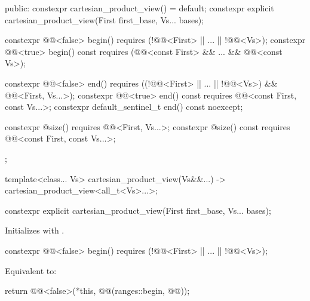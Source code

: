 \begin{codeblock}
{{  public:
    constexpr cartesian_product_view() = default;
    constexpr explicit cartesian_product_view(First first_base, Vs... bases);

    constexpr @@<false> begin()
      requires (!@@<First> || ... || !@@<Vs>);
    constexpr @@<true> begin() const
      requires (@@<const First> && ... && @@<const Vs>);

    constexpr @@<false> end()
      requires ((!@@<First> || ... || !@@<Vs>) &&
        @@<First, Vs...>);
    constexpr @@<true> end() const
      requires @@<const First, const Vs...>;
    constexpr default_sentinel_t end() const noexcept;

    constexpr @\seebelow@ size()
      requires @@<First, Vs...>;
    constexpr @\seebelow@ size() const
      requires @@<const First, const Vs...>;
  };

  template<class... Vs>
    cartesian_product_view(Vs&&...) -> cartesian_product_view<all_t<Vs>...>;
}
\end{codeblock}

\begin{itemdecl}
constexpr explicit cartesian_product_view(First first_base, Vs... bases);
\end{itemdecl}

\begin{itemdescr}
\pnum
\effects
Initializes 
with .
\end{itemdescr}

\begin{itemdecl}
constexpr @@<false> begin()
  requires (!@@<First> || ... || !@@<Vs>);
\end{itemdecl}

\begin{itemdescr}
\pnum
\effects
Equivalent to:
\begin{codeblock}
return @@<false>(*this, @@(ranges::begin, @@));
\end{codeblock}
\end{itemdescr}

